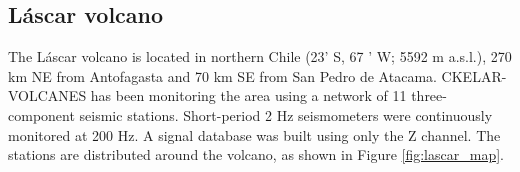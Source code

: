 \documentclass[journal]{IEEEtran}
\begin{document}
\subsection{Láscar volcano}
The Láscar volcano is located in northern Chile (23' S, 67 ' W; 5592 m a.s.l.), 270 km NE from Antofagasta and 70 km SE from San Pedro de Atacama. CKELAR-VOLCANES has been monitoring the area using a network of 11 three-component seismic stations. Short-period 2 Hz seismometers were continuously monitored at 200 Hz. A signal database was built using only the Z channel. The stations are distributed around the volcano, as shown in Figure \ref{fig:lascar_map}. 
\begin{figure}
  \begin{subfigure}{0.27\textwidth}
  
\end{subfigure}
\end{figure}
\end{document}

